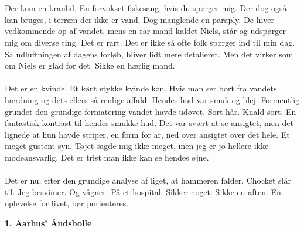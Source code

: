 \documentclass[]{article}
\begin{document}
\\ \\
Der kom en kranbil. En forvokset fiskesang, hvis du spørger mig. Der dog også kan bruges, i terræn der ikke er vand. Dog manglende en paraply. De hiver vedkommende op af vandet, mens en rar mand kaldet Niels, står og udspørger mig om diverse ting. Det er rart. Det er ikke så ofte folk spørger ind til min dag. Så udluftningen af dagens forløb, bliver lidt mere detalieret. Men det virker som om Niels er glad for det. Sikke en hærlig mand.
\\ \\
Det er en kvinde. Et kønt stykke kvinde køn. Hvis man ser bort fra vandets hærdning og dets ellers så renlige affald. Hendes hud var smuk og blej. Formentlig grundet den grundige fermatering vandet havde udøvet. Sort hår. Knald sort. En fantastisk kontrast til hendes smukke hud. Det var svært at se ansigtet, men det lignede at hun havde striper, en form for ar, ned over ansigtet over det hele. Et meget gustent syn. Tøjet sagde mig ikke meget, men jeg er jo hellere ikke modeansvarlig. Det er trist man ikke kan se hendes øjne.
\\ \\
Det er nu, efter den grundige analyse af liget, at hammeren falder. Chocket slår til. Jeg besvimer. Og vågner. På et hospital. Sikker noget. Sikke en aften. En oplevelse for livet, bør porienteres.


\begin{center}
	\large\textbf{1. Aarhus' Åndsbolle}
\end{center}
\end{document}
